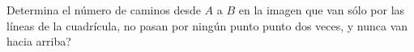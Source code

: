 Determina el número de caminos desde $A$ a $B$ en la imagen que van sólo por las líneas de la cuadrícula, no pasan por ningún punto
punto dos veces, y nunca van hacia arriba?
